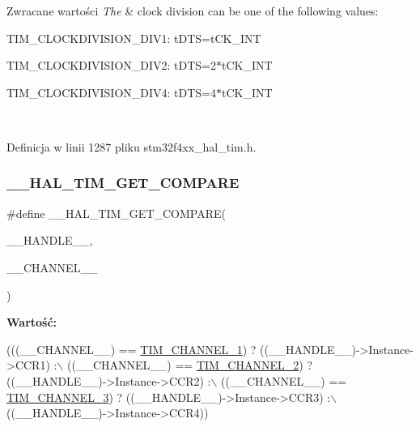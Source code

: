 \begin{DoxyRetVals}{Zwracane wartości}
{\em The} & clock division can be one of the following values\+: \begin{DoxyItemize}
\item T\+I\+M\+\_\+\+C\+L\+O\+C\+K\+D\+I\+V\+I\+S\+I\+O\+N\+\_\+\+D\+I\+V1\+: t\+D\+TS=t\+C\+K\+\_\+\+I\+NT \item T\+I\+M\+\_\+\+C\+L\+O\+C\+K\+D\+I\+V\+I\+S\+I\+O\+N\+\_\+\+D\+I\+V2\+: t\+D\+TS=2$\ast$t\+C\+K\+\_\+\+I\+NT \item T\+I\+M\+\_\+\+C\+L\+O\+C\+K\+D\+I\+V\+I\+S\+I\+O\+N\+\_\+\+D\+I\+V4\+: t\+D\+TS=4$\ast$t\+C\+K\+\_\+\+I\+NT \end{DoxyItemize}
\\
\hline
\end{DoxyRetVals}


Definicja w linii 1287 pliku stm32f4xx\+\_\+hal\+\_\+tim.\+h.

\mbox{\label{group___t_i_m___exported___macros_gaa40722f56910966e1da5241b610eed84}} 
\subsubsection{\texorpdfstring{\+\_\+\+\_\+\+H\+A\+L\+\_\+\+T\+I\+M\+\_\+\+G\+E\+T\+\_\+\+C\+O\+M\+P\+A\+RE}{\_\_HAL\_TIM\_GET\_COMPARE}}
{\footnotesize\ttfamily \#define \+\_\+\+\_\+\+H\+A\+L\+\_\+\+T\+I\+M\+\_\+\+G\+E\+T\+\_\+\+C\+O\+M\+P\+A\+RE(\begin{DoxyParamCaption}\item[{}]{\+\_\+\+\_\+\+H\+A\+N\+D\+L\+E\+\_\+\+\_\+,  }\item[{}]{\+\_\+\+\_\+\+C\+H\+A\+N\+N\+E\+L\+\_\+\+\_\+ }\end{DoxyParamCaption})}

{\bfseries Wartość\+:}
\begin{DoxyCode}
(((\_\_CHANNEL\_\_) == \hyperlink{group___t_i_m___channel_ga6b1541e4a49d62610899e24bf23f4879}{TIM\_CHANNEL\_1}) ? ((\_\_HANDLE\_\_)->Instance->CCR1) :\(\backslash\)
   ((\_\_CHANNEL\_\_) == \hyperlink{group___t_i_m___channel_ga33e02d43345a7ac5886f01b39e4f7ccd}{TIM\_CHANNEL\_2}) ? ((\_\_HANDLE\_\_)->Instance->CCR2) :\(\backslash\)
   ((\_\_CHANNEL\_\_) == \hyperlink{group___t_i_m___channel_ga4ea100c1789b178f3cb46721b7257e2d}{TIM\_CHANNEL\_3}) ? ((\_\_HANDLE\_\_)->Instance->CCR3) :\(\backslash\)
   ((\_\_HANDLE\_\_)->Instance->CCR4))
\end{DoxyCode}


